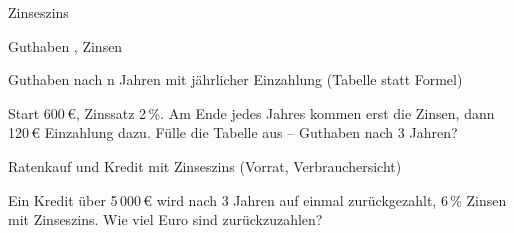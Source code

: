 \begin{aufgabe}{Zinseszins}
\begin{teile}
Guthaben \leerfeld[€] , Zinsen \leerfeld[€]
\end{teile}
\end{aufgabe}

\begin{aufgabe}{Guthaben nach n Jahren mit jährlicher Einzahlung (Tabelle statt Formel)}
\begin{teile}
\teil Start 600\,€, Zinssatz 2\,\%. Am Ende jedes Jahres kommen erst die Zinsen, dann 120\,€ Einzahlung dazu. Fülle die Tabelle aus – Guthaben nach 3 Jahren?

\leerfeld[€]
\end{teile}
\end{aufgabe}

\begin{aufgabe}{Ratenkauf und Kredit mit Zinseszins (Vorrat, Verbrauchersicht)}
\begin{teile}
\teil Ein Kredit über 5\,000\,€ wird nach 3 Jahren auf einmal zurückgezahlt, 6\,\% Zinsen mit Zinseszins. Wie viel Euro sind zurückzuzahlen? \leerfeld[€]
\end{teile}
\end{aufgabe}

